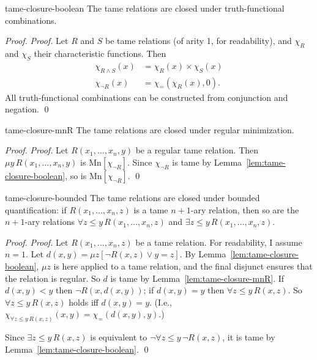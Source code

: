 \begin{lemma}{}{tame-closure-boolean}
    The tame relations are closed under truth-functional combinations.
\end{lemma}
\begin{proof}
    \emph{Proof.}
    Let $R$ and $S$ be tame relations (of arity 1, for readability),
    and $\chi_R$ and $\chi_S$ their characteristic functions.
    Then
    \begin{align*}
      \chi_{R \land S}(x) &= \chi_{R}(x) \times \chi_{S}(x)\\
      \chi_{\neg R}(x) &= \chi_=(\chi_{R}(x),0).
    \end{align*}
    All truth-functional combinations can be constructed from conjunction and negation.
    \qed
\end{proof}

\begin{lemma}{}{tame-closure-mnR}
  The tame relations are closed under regular minimization.
\end{lemma}
\begin{proof}
  \emph{Proof.}
  Let $R(x_{1},\ldots,x_{n},y)$ be a regular tame relation.
  Then $\mu y\, R(x_{1},\ldots,x_{n},y)$ is $\mathrm{Mn}[\chi_{\neg R}]$.
  Since $\chi_{\neg R}$ is tame by Lemma~\ref{lem:tame-closure-boolean},
  so is $\mathrm{Mn}[\chi_{\neg R}]$.
  \qed
\end{proof}

\begin{lemma}{}{tame-closure-bounded}
  The tame relations are closed under bounded quantification:
  if $R(x_{1},\ldots,x_{n},z)$ is a tame $n\!+\!1$-ary relation,
  then so are the $n\!+\!1$-ary relations $\forall z \leq y\, R(x_{1},\ldots,x_{n},z)$
  and $\exists z \leq y\, R(x_{1},\ldots,x_{n},z)$.
\end{lemma}
\begin{proof}
  \emph{Proof.}
  Let $R(x_{1},\ldots,x_{n},z)$ be a tame relation.
  For readability, I assume $n=1$.
  Let $d(x,y) = \mu z [\neg R(x,z) \lor y=z]$.
  By Lemma~\ref{lem:tame-closure-boolean},
  $\mu z$ is here applied to a tame relation,
  and the final disjunct ensures that the relation is regular.
  So $d$ is tame by Lemma~\ref{lem:tame-closure-mnR}.
  If $d(x,y) < y$ then $\neg R(x,d(x,y))$;
  if $d(x,y) = y$ then $\forall z \leq y\, R(x,z)$.
  So $\forall z \leq y\, R(x,z)$ holds iff $d(x,y) = y$.
  (I.e., $\chi_{\forall z \leq y\, R(x,z)}(x,y) = \chi_=(d(x,y),y)$.)

  Since $\exists z \leq y\, R(x,z)$ is equivalent to $\neg \forall z \leq y\, \neg R(x,z)$,
  it is tame by Lemma~\ref{lem:tame-closure-boolean}.
  \qed
\end{proof}

